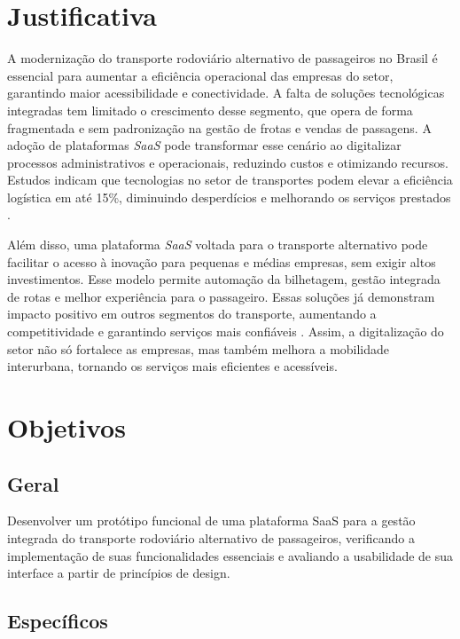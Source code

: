 \section{Justificativa}

A modernização do transporte rodoviário alternativo de passageiros no Brasil é essencial para aumentar a eficiência operacional das empresas do setor, garantindo maior acessibilidade e conectividade. A falta de soluções tecnológicas integradas tem limitado o crescimento desse segmento, que opera de forma fragmentada e sem padronização na gestão de frotas e vendas de passagens. A adoção de plataformas \textit{SaaS} pode transformar esse cenário ao digitalizar processos administrativos e operacionais, reduzindo custos e otimizando recursos. Estudos indicam que tecnologias no setor de transportes podem elevar a eficiência logística em até 15\%, diminuindo desperdícios e melhorando os serviços prestados \cite{setcepar2023}.

Além disso, uma plataforma \textit{SaaS} voltada para o transporte alternativo pode facilitar o acesso à inovação para pequenas e médias empresas, sem exigir altos investimentos. Esse modelo permite automação da bilhetagem, gestão integrada de rotas e melhor experiência para o passageiro. Essas soluções já demonstram impacto positivo em outros segmentos do transporte, aumentando a competitividade e garantindo serviços mais confiáveis \cite{prologapp2024}. Assim, a digitalização do setor não só fortalece as empresas, mas também melhora a mobilidade interurbana, tornando os serviços mais eficientes e acessíveis.


\section{Objetivos}

\subsection{Geral}

Desenvolver um protótipo funcional de uma plataforma SaaS para a gestão integrada do transporte rodoviário alternativo de passageiros, verificando a implementação de suas funcionalidades essenciais e avaliando a usabilidade de sua interface a partir de princípios de design.

\subsection{Específicos}

